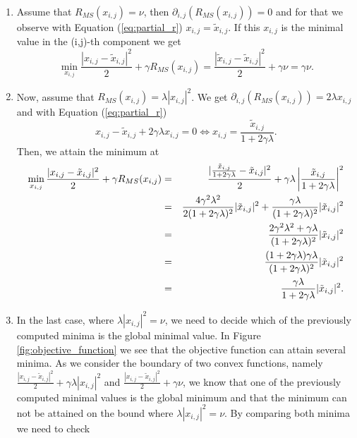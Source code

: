 \documentclass[abstracton]{scrreprt}
\begin{document}
                \begin{enumerate}
                    \item Assume that $R_{MS}(x_{i,j}) = \nu$, then $\partial_{i,j} \left(R_{MS}(x_{i,j})\right) = 0$
                    and for that we observe with Equation (\ref{eq:partial_r}) $x_{i,j} = \tilde{x}_{i,j}$. If this $x_{i,j}$ is the minimal value in the (i,j)-th component we get
                        $$
                            \min_{x_{i,j}} \frac{|x_{i,j} - \tilde{x}_{i,j}|^{2}}{2} + \gamma R_{MS}(x_{i,j}) = \frac{|\tilde{x}_{i,j} - \tilde{x}_{i,j}|^{2}}{2} + \gamma \nu = \gamma \nu.
                        $$
                    \item Now, assume that $R_{MS}(x_{i,j}) = \lambda|x_{i,j}|^{2}$. We get $\partial_{i,j} \left(R_{MS}(x_{i,j})\right) = 2\lambda x_{i,j}$ and with Equation (\ref{eq:partial_r})
                        $$
                            x_{i,j} - \tilde{x}_{i,j} + 2 \gamma \lambda x_{i,j} = 0 \iff x_{i,j} = \frac{\tilde{x}_{i,j}}{1 + 2 \gamma \lambda}.
                        $$
                    Then, we attain the minimum at
                        \begin{eqnarray}
                            \min_{x_{i,j}} \frac{|x_{i,j} - \tilde{x}_{i,j}|^{2}}{2} + \gamma R_{MS}(x_{i,j}) &=& \frac{|\frac{\tilde{x}_{i,j}}{1 + 2 \gamma \lambda} - \tilde{x}_{i,j}|^{2}}{2} + \gamma \lambda \left|\frac{\tilde{x}_{i,j}}{1 + 2 \gamma \lambda}\right|^{2} \notag \\
                            &=& \frac{4\gamma^{2}\lambda^{2}}{2(1 + 2\gamma\lambda)^{2}} |\tilde{x}_{i,j}|^{2} + \frac{\gamma\lambda}{(1 + 2\gamma\lambda)^{2}} |\tilde{x}_{i,j}|^{2} \notag \\
                            &=& \frac{2\gamma^{2}\lambda^{2} + \gamma\lambda}{(1 + 2\gamma\lambda)^{2}} |\tilde{x}_{i,j}|^{2} \notag \\
                            &=& \frac{(1 + 2\gamma\lambda)\gamma\lambda}{(1 + 2\gamma\lambda)^{2}} |\tilde{x}_{i,j}|^{2} \notag \\
                            &=& \frac{\gamma\lambda}{1 + 2\gamma\lambda} |\tilde{x}_{i,j}|^{2}. \label{eq:bound_on_p}
                        \end{eqnarray}
                    \item In the last case, where $\lambda |x_{i,j}|^{2} = \nu$, we need to decide which of the previously computed minima is the global minimal value. In Figure \ref{fig:objective_function} we see that the objective function can attain several minima. As we consider the boundary of two convex functions, namely $\frac{|x_{i,j} - \tilde{x}_{i,j}|^{2}}{2} + \gamma \lambda |x_{i,j}|^{2}$ and $\frac{|x_{i,j} - \tilde{x}_{i,j}|^{2}}{2} + \gamma \nu$, we know that one of the previously computed minimal values is the global minimum and that the minimum can not be attained on the bound where $\lambda |x_{i,j}|^{2} = \nu$. By comparing both minima we need to check

\end{enumerate}
\end{document}
